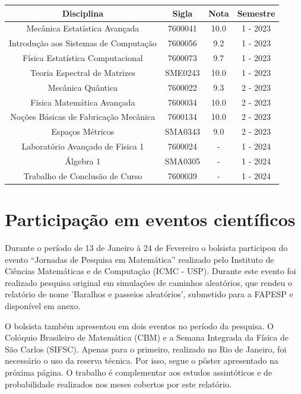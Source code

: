 \documentclass[12pt]{report}
\begin{document}
\begin{center}
	\begin{tabular}{|c|c|c|c|}
		\hline
		Disciplina & Sigla & Nota & Semestre \\
		\hline
		Mecânica Estatística Avançada & 7600041 & 10.0 & 1 - 2023 \\
		\hline
		Introdução aos Sistemas de Computação & 7600056 & 9.2 & 1 - 2023 \\
		\hline
		Física Estatística Computacional & 7600073 & 9.7 & 1 - 2023 \\
		\hline
		Teoria Espectral de Matrizes & SME0243 & 10.0 & 1 - 2023 \\
		\hline
		Mecânica Quântica & 7600022 & 9.3 & 2 - 2023 \\
		\hline
		Física Matemática Avançada & 7600034 & 10.0 & 2 - 2023 \\
		\hline
		Noções Básicas de Fabricação Mecânica & 7600134 & 10.0 & 2 - 2023 \\
		\hline
		Espaços Métricos & SMA0343 & 9.0 & 2 - 2023 \\
		\hline
		Laboratório Avançado de Física 1& 7600024 & - & 1 - 2024 \\
		\hline
		Álgebra 1 & SMA0305 & - & 1 - 2024 \\
		\hline
		Trabalho de Conclusão de Curso & 7600039 & - & 1 - 2024 \\
		\hline
	\end{tabular}
\end{center}

\section{Participação em eventos científicos}\label{chp:particEvento}

Durante o período de 13 de Janeiro à 24 de Fevereiro o bolsista participou do evento ``Jornadas de Pesquisa em Matemática'' realizado pelo Instituto de Ciências Matemáticas e de Computação (ICMC - USP). Durante este evento foi realizado pesquisa original em simulações de caminhos aleatórios, que rendeu o relatório de nome 'Baralhos e passeios aleatórios', submetido para a FAPESP e disponível em anexo.

O bolsista também apresentou em dois eventos no período da pesquisa. O Colóquio Brasileiro de Matemática (CBM) e a Semana Integrada da Física de São Carlos (SIFSC). Apenas para o primeiro, realizado no Rio de Janeiro, foi necessário o uso da reserva técnica. Por isso, segue o pôster apresentado na próxima página. O trabalho é complementar aos estudos assintóticos e de probabilidade realizados nos meses cobertos por este relatório.
\end{document}
